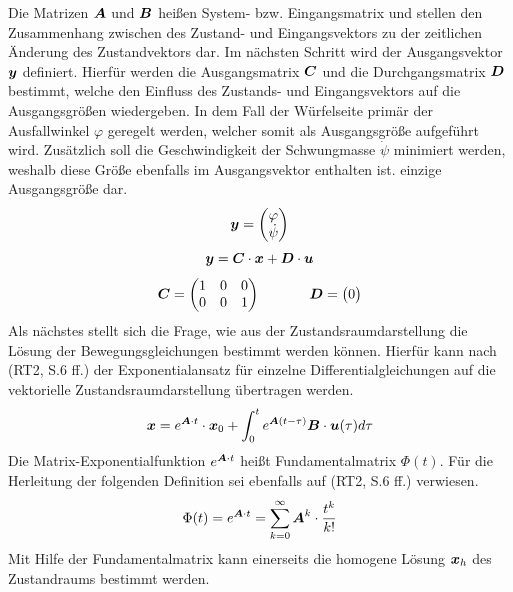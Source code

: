 Die Matrizen $\boldsymbol{A}$ und $\boldsymbol{B}$ heißen System- bzw. Eingangsmatrix und stellen den Zusammenhang zwischen des Zustand- und Eingangsvektors zu der zeitlichen Änderung des Zustandvektors dar.
Im nächsten Schritt wird der Ausgangsvektor $\boldsymbol{y}$ definiert. Hierfür werden die Ausgangsmatrix $\boldsymbol{C}$ und die Durchgangsmatrix $\boldsymbol{D}$ bestimmt, welche den Einfluss des Zustands- und Eingangsvektors auf die Ausgangsgrößen wiedergeben. In dem Fall der Würfelseite primär der Ausfallwinkel $\varphi$ geregelt werden, welcher somit als Ausgangsgröße aufgeführt wird. Zusätzlich soll die Geschwindigkeit der Schwungmasse $\dot{\psi}$ minimiert werden, weshalb diese Größe ebenfalls im Ausgangsvektor enthalten ist. einzige Ausgangsgröße dar.
\begin{equation}
\boldsymbol{y} = \begin{pmatrix}
\varphi \\ \dot{\psi}
\end{pmatrix}
\end{equation}
\begin{equation}
\boldsymbol{y} = \boldsymbol{C} \cdot \boldsymbol{x} + \boldsymbol{D} \cdot \boldsymbol{u}
\end{equation}
\begin{equation}
\boldsymbol{C} = \begin{pmatrix}
1 & 0 & 0 \\ 0 & 0 & 1
\end{pmatrix}
\hspace{35pt}
\boldsymbol{D} = \begin{pmatrix}
0
\end{pmatrix}
\end{equation}
Als nächstes stellt sich die Frage, wie aus der Zustandsraumdarstellung die Lösung der Bewegungsgleichungen bestimmt werden können. Hierfür kann nach (RT2, S.6 ff.) der Exponentialansatz für einzelne Differentialgleichungen auf die vektorielle Zustandsraumdarstellung übertragen werden.
\begin{equation}
\boldsymbol{x} = e^{\boldsymbol{A}\cdot t} \cdot \boldsymbol{x}_0 + \int^t_0 e^{\boldsymbol{A}(t - \tau)} \boldsymbol{B}\cdot \boldsymbol{u}(\tau) d\tau
\end{equation}
Die Matrix-Exponentialfunktion $e^{\boldsymbol{A}\cdot t}$ heißt Fundamentalmatrix $\Phi(t)$. Für die Herleitung der folgenden Definition sei ebenfalls auf (RT2, S.6 ff.) verwiesen.
\begin{equation}
\Phi(t) = e^{\boldsymbol{A}\cdot t} = \sum^{\infty}_{k=0} \boldsymbol{A}^k \cdot \frac{t^k}{k!}
\end{equation}
Mit Hilfe der Fundamentalmatrix kann einerseits die homogene Lösung $\boldsymbol{x}_h$ des Zustandraums bestimmt werden.

